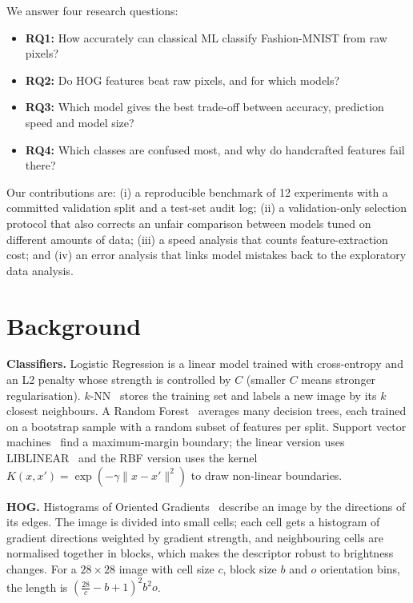 \documentclass[conference]{IEEEtran}
\begin{document}
We answer four research questions:
\begin{itemize}
  \item \textbf{RQ1:} How accurately can classical ML classify Fashion-MNIST from raw pixels?
  \item \textbf{RQ2:} Do HOG features beat raw pixels, and for which models?
  \item \textbf{RQ3:} Which model gives the best trade-off between accuracy, prediction speed and model size?
  \item \textbf{RQ4:} Which classes are confused most, and why do handcrafted features fail there?
\end{itemize}

Our contributions are: (i) a reproducible benchmark of 12 experiments with a committed validation split and a test-set
audit log; (ii) a validation-only selection protocol that also corrects an unfair comparison between models tuned on
different amounts of data; (iii) a speed analysis that counts feature-extraction cost; and (iv) an error analysis that
links model mistakes back to the exploratory data analysis.

\section{Background}
\textbf{Classifiers.} Logistic Regression is a linear model trained with cross-entropy and an L2 penalty whose strength
is controlled by $C$ (smaller $C$ means stronger regularisation). $k$-NN~\cite{cover1967nearest} stores the training set
and labels a new image by its $k$ closest neighbours. A Random Forest~\cite{breiman2001random} averages many decision
trees, each trained on a bootstrap sample with a random subset of features per split. Support vector
machines~\cite{cortes1995support} find a maximum-margin boundary; the linear version uses LIBLINEAR~\cite{fan2008liblinear}
and the RBF version uses the kernel $K(x,x')=\exp(-\gamma\lVert x-x'\rVert^2)$ to draw non-linear boundaries.

\textbf{HOG.} Histograms of Oriented Gradients~\cite{dalal2005histograms} describe an image by the directions of its edges.
The image is divided into small cells; each cell gets a histogram of gradient directions weighted by gradient strength,
and neighbouring cells are normalised together in blocks, which makes the descriptor robust to brightness changes. For a
$28\times28$ image with cell size $c$, block size $b$ and $o$ orientation bins, the length is
$\left(\frac{28}{c}-b+1\right)^2 b^2 o$.
\end{document}
